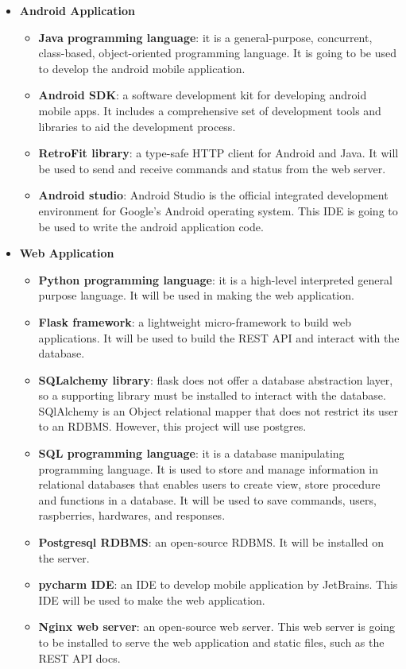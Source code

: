 \documentclass[12pt, oneside, a4paper]{book}
\newcommand\boldcolor[1]{\textcolor{bold}{\textbf{#1}}}
\begin{document}
			\begin{itemize}
				\item \boldcolor{Android Application}
				\begin{itemize}
					\item \textbf{Java programming language}: it  is  a  general-purpose,  concurrent,  class-based,  object-oriented  programming  language\cite{java}. It is going to be used to develop the android mobile application.
					\item \textbf{Android SDK}: a software development kit for developing android mobile apps. It includes a comprehensive set of development tools and libraries to aid the development process\cite{android_studio}.
					\item \textbf{RetroFit library}: a type-safe HTTP client for Android and Java\cite{retro}. It will be used to send and receive commands and status from the web server.
					\item \textbf{Android studio}: Android Studio is the official integrated development environment for Google's Android operating system\cite{android_studio}. This IDE is going to be used to write the android application code.
				\end{itemize}
				\item \boldcolor{Web Application}
				\begin{itemize}
					\item \textbf{Python programming language}: it is a high-level interpreted general purpose language\cite{python}. It will be used in making the web application.
					\item \textbf{Flask framework}: a lightweight micro-framework to build web applications\cite{flask}. It will be used to build the REST API and interact with the database.
					\item \textbf{SQLalchemy library}: flask does not offer a database abstraction layer\cite{flask}, so a supporting library must be installed to interact with the database. SQlAlchemy is an Object relational mapper that does not restrict its user to an RDBMS\cite{sqlalchemy}. However, this project will use postgres.
					\item \textbf{SQL programming language}: it is a database manipulating programming language. It is used to store and manage information in relational databases that enables users to create view, store procedure and functions in a database\cite{sql}. It will be used to save commands, users, raspberries, hardwares, and responses.
					\item \textbf{Postgresql RDBMS}:  an open-source RDBMS\cite{postgres}. It will be installed on the server.
					\item \textbf{pycharm IDE}: an IDE to develop mobile application by JetBrains\cite{pycharm}. This IDE will be used to make the web application.
					\item \textbf{Nginx web server}: an open-source web server\cite{nginx}. This web server is going to be installed to serve the web application and static files, such as the REST API docs.
				\end{itemize}


\end{itemize}
\end{document}
